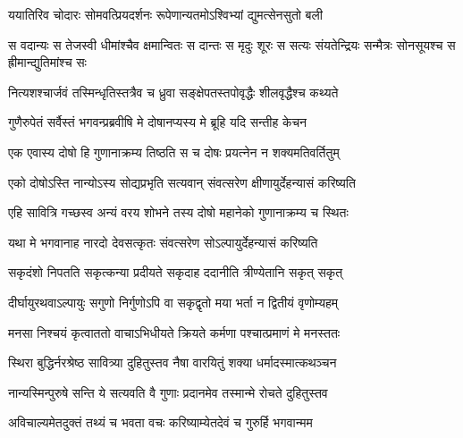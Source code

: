 \begin{center}
\twolineshloka
{ययातिरिव चोदारः सोमवत्प्रियदर्शनः}
{रूपेणान्यतमोऽश्विभ्यां द्युमत्सेनसुतो बली}


\threelineshloka
{स वदान्यः स तेजस्वी धीमांश्चैव क्षमान्वितः}
{स दान्तः स मृदुः शूरः स सत्यः संयतेन्द्रियः}
{सन्मैत्रः सोनसूयश्च स ह्रीमान्द्युतिमांश्च सः}


\twolineshloka
{नित्यशश्चार्जवं तस्मिन्धृतिस्तत्रैव च ध्रुवा}
{सङ्क्षेपतस्तपोवृद्धैः शीलवृद्धैश्च कथ्यते}




\twolineshloka
{गुणैरुपेतं सर्वैस्तं भगवन्प्रब्रवीषि मे}
{दोषानप्यस्य मे ब्रूहि यदि सन्तीह केचन}




\twolineshloka
{एक एवास्य दोषो हि गुणानाक्रम्य तिष्ठति}
{स च दोषः प्रयत्नेन न शक्यमतिवर्तितुम्}


\twolineshloka
{एको दोषोऽस्ति नान्योऽस्य सोद्यप्रभृति सत्यवान्}
{संवत्सरेण क्षीणायुर्देहन्यासं करिष्यति}




\twolineshloka
{एहि सावित्रि गच्छस्व अन्यं वरय शोभने}
{तस्य दोषो महानेको गुणानाक्रम्य च स्थितः}


\twolineshloka
{यथा मे भगवानाह नारदो देवसत्कृतः}
{संवत्सरेण सोऽल्पायुर्देहन्यासं करिष्यति}




\twolineshloka
{सकृदंशो निपतति सकृत्कन्या प्रदीयते}
{सकृदाह ददानीति त्रीण्येतानि सकृत् सकृत्}


\twolineshloka
{दीर्घायुरथवाऽल्पायुः सगुणो निर्गुणोऽपि वा}
{सकृद्वृतो मया भर्ता न द्वितीयं वृणोम्यहम्}


\twolineshloka
{मनसा निश्चयं कृत्वाततो वाचाऽभिधीयते}
{क्रियते कर्मणा पश्चात्प्रमाणं मे मनस्ततः}




\twolineshloka
{स्थिरा बुद्धिर्नरश्रेष्ठ सावित्र्या दुहितुस्तव}
{नैषा वारयितुं शक्या धर्मादस्मात्कथञ्चन}


\twolineshloka
{नान्यस्मिन्पुरुषे सन्ति ये सत्यवति वै गुणाः}
{प्रदानमेव तस्मान्मे रोचते दुहितुस्तव}




\twolineshloka
{अविचाल्यमेतदुक्तं तथ्यं च भवता वचः}
{करिष्याम्येतदेवं च गुरुर्हि भगवान्मम}


\end{center}
